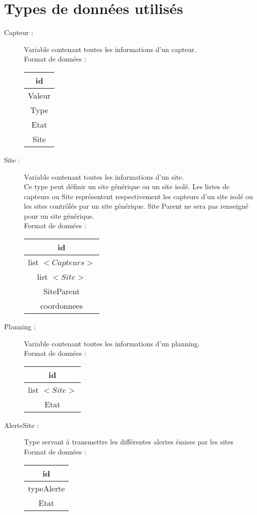 \section{Types de données utilisés}
	\begin{description}
	\item [Capteur : ] Variable contenant toutes les informations d'un capteur.\\
	Format de données :		
	\begin{tabular}{|c|}
	\hline
	id\\
	\hline
	Valeur\\
	\hline
	Type\\
	\hline
	Etat\\
	\hline
	Site\\
	\hline
	\end{tabular}

	\item [Site : ] Variable contenant toutes les informations d'un site.\\
	Ce type peut définir un site générique ou un site isolé. Les listes de capteurs ou Site représentent respectivement les capteurs d'un site isolé ou les sites contrôlés par un site générique. Site Parent ne sera pas renseigné pour un site générique.\\
	Format de données :		
	\begin{tabular}{|c|}
	\hline
	id\\
	\hline
	list $<Capteurs>$\\
	\hline
	list $<Site>$\\
	\hline
	SiteParent\\
	\hline
	coordonnees\\
	\hline
	\end{tabular}

	\item [Planning : ] Variable contenant toutes les informations d'un planning.\\
	Format de données :		
	\begin{tabular}{|c|}
	\hline
	id\\
	\hline
	list $<Site>$\\
	\hline
	Etat\\
	\hline
	\end{tabular}

	\item [AlerteSite : ] Type servant à transmettre les différentes alertes émises par les sites\\
	Format de données :		
	\begin{tabular}{|c|}
	\hline
	id\\
	\hline
	typeAlerte\\
	\hline
	Etat\\
	\hline
	\end{tabular}

			
	\end{description} 



